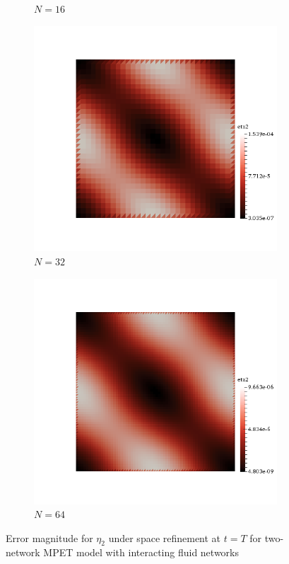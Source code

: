 \begin{figure}[h!]
\begin{subfigure}[b]{0.24\textwidth}
    \caption{$N=16$}
  \end{subfigure}
  \begin{subfigure}[b]{0.24\textwidth}
    \includegraphics[width=\textwidth,height=\textheight,keepaspectratio,height=\textheight,keepaspectratio]{figures/2_mpet/no_transfer/space/eta2_32.png}
    \caption{$N=32$}
  \end{subfigure}
  \begin{subfigure}[b]{0.24\textwidth}
    \includegraphics[width=\textwidth,height=\textheight,keepaspectratio,height=\textheight,keepaspectratio]{figures/2_mpet/no_transfer/space/eta2_64.png}
    \caption{$N=64$}
  \end{subfigure}
  \caption{Error magnitude for $\eta_2$ under space refinement at $t=T$ for two-network MPET model with interacting fluid networks} \label{fig:bb_default_eta2}
\end{figure}

